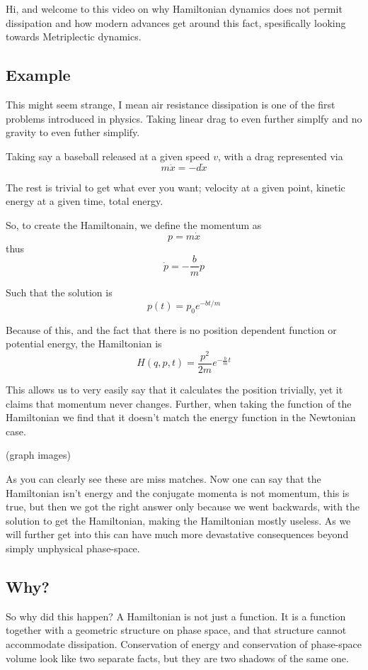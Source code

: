 Hi, and welcome to this video on why Hamiltonian dynamics does not permit dissipation and how modern advances get around this fact, spesifically looking towards Metriplectic dynamics.


\subsection{Example}

This might seem strange, I mean air resistance dissipation is one of the first problems introduced in physics. Taking linear drag to even further simplfy and no gravity to even futher simplify.

Taking say a baseball released at a given speed $v$, with a drag represented via
\[
	m \ddot{x} = -d \dot{x}
\]

The rest is trivial to get what ever you want; velocity at a given point, kinetic energy at a given time, total energy.

So, to create the Hamiltonain, we define the momentum as
\[
	p = m \dot{x}
\]
thus
\[
	\dot{p} = -\frac{b}{m}p
\]

Such that the solution is
\[
	p(t) = p_0 e^{-bt/m}
\]

Because of this, and the fact that there is no position dependent function or potential energy, the Hamiltonian is
\[
	H(q,p,t) = \frac{p^2}{2m} e^{-\frac{b}{m}t}
\]

This allows us to very easily say that it calculates the position trivially, yet it claims that momentum never changes. Further, when taking the function of the Hamiltonian we find that it doesn't match the energy function in the Newtonian case.

(graph images)

As you can clearly see these are miss matches. Now one can say that the Hamiltonian isn't energy and the conjugate momenta is not momentum, this is true, but then we got the right answer only because we went backwards, with the solution to get the Hamiltonian, making the Hamiltonian mostly useless. As we will further get into this can have much more devastative consequences beyond simply unphysical phase-space.


\subsection{Why?}

So why did this happen? A Hamiltonian is not just a function. It is a function together with a geometric structure on phase space, and that structure cannot accommodate dissipation. Conservation of energy and conservation of phase-space volume look like two separate facts, but they are two shadows of the same one.


